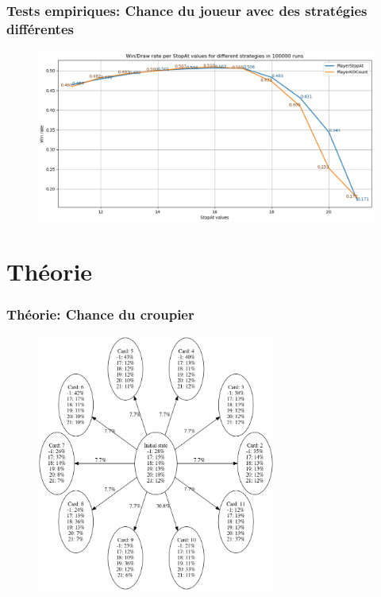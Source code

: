 \documentclass{beamer}
\begin{document}
\begin{frame}
    \frametitle{Tests empiriques: Chance du joueur avec des stratégies différentes}
    \begin{figure}[H]
        \begin{center}
            \includegraphics[width=1\textwidth]{empirical_graph3}
        \end{center}
    \end{figure}
\end{frame}

\section{Théorie}

\begin{frame}
    \frametitle{Théorie: Chance du croupier}
    \begin{figure}[H]
        \begin{center}
            \includegraphics[width=0.7\textwidth]{theoretical_croupier}
        \end{center}
    \end{figure}
\end{frame}
\end{document}
